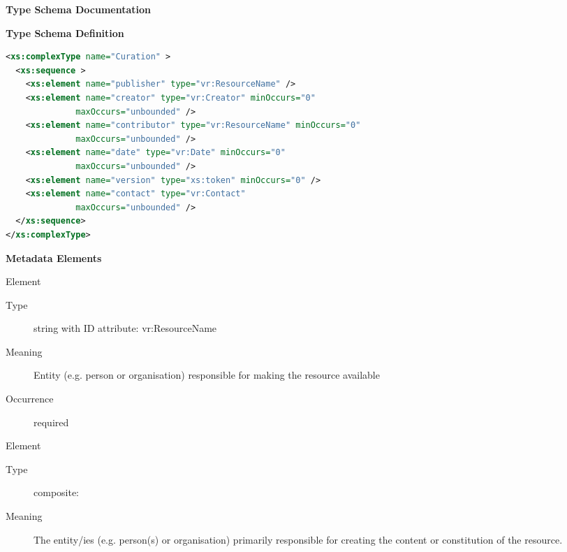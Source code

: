 \documentclass[11pt,a4paper]{ivoa}
\begin{document}
\begin{generated}
\begingroup
        \renewcommand*\descriptionlabel[1]{%
        \hbox to 5.5em{\emph{#1}\hfil}}\vspace{2ex}\noindent\textbf{ Type Schema Documentation}


\vspace{1ex}\noindent\textbf{ Type Schema Definition}

\begin{lstlisting}[language=XML,basicstyle=\footnotesize]
<xs:complexType name="Curation" >
  <xs:sequence >
    <xs:element name="publisher" type="vr:ResourceName" />
    <xs:element name="creator" type="vr:Creator" minOccurs="0"
              maxOccurs="unbounded" />
    <xs:element name="contributor" type="vr:ResourceName" minOccurs="0"
              maxOccurs="unbounded" />
    <xs:element name="date" type="vr:Date" minOccurs="0"
              maxOccurs="unbounded" />
    <xs:element name="version" type="xs:token" minOccurs="0" />
    <xs:element name="contact" type="vr:Contact"
              maxOccurs="unbounded" />
  </xs:sequence>
</xs:complexType>
\end{lstlisting}

\vspace{0.5ex}\noindent\textbf{ Metadata Elements}

\begingroup\small\begin{bigdescription}\item[Element \xmlel{publisher}]
\begin{description}
\item[Type] string with ID attribute: vr:ResourceName
\item[Meaning]
               Entity (e.g. person or organisation) responsible for making the
               resource available

\item[Occurrence] required

\end{description}
\item[Element \xmlel{creator}]
\begin{description}
\item[Type] composite: 
\item[Meaning]
                The entity/ies (e.g. person(s) or organisation) primarily responsible
                for creating the content or constitution of the resource.


\end{description}
\end{bigdescription}
\end{generated}
\end{document}
